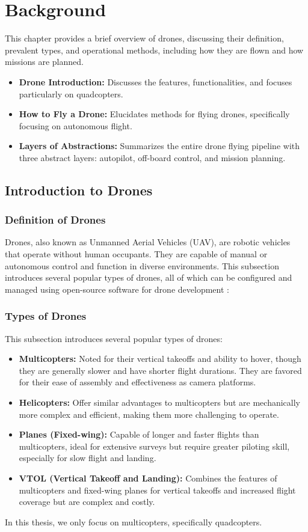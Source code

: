 \chapter{Background}
\label{hello}

This chapter provides a brief overview of drones, discussing their definition, prevalent types, and operational methods, including how they are flown and how missions are planned.

\begin{itemize}
    \item \textbf{Drone Introduction:} Discusses the features, functionalities, and focuses particularly on quadcopters.
    \item \textbf{How to Fly a Drone:} Elucidates methods for flying drones, specifically focusing on autonomous flight.
    \item \textbf{Layers of Abstractions:} Summarizes the entire drone flying pipeline with three abstract layers: autopilot, off-board control, and mission planning.
\end{itemize}

\section{Introduction to Drones}
\subsection{Definition of Drones}
Drones, also known as Unmanned Aerial Vehicles (UAV), are robotic vehicles that operate without human occupants. They are capable of manual or autonomous control and function in diverse environments.
This subsection introduces several popular types of drones, all of which can be configured and managed using open-source software for drone development \cite{px4docs2023} \cite{ardupilot2023}:
\subsection{Types of Drones}
This subsection introduces several popular types of drones:
\begin{itemize}
    \item \textbf{Multicopters:} Noted for their vertical takeoffs and ability to hover, though they are generally slower and have shorter flight durations. They are favored for their ease of assembly and effectiveness as camera platforms.
    \item \textbf{Helicopters:} Offer similar advantages to multicopters but are mechanically more complex and efficient, making them more challenging to operate.
    \item \textbf{Planes (Fixed-wing):} Capable of longer and faster flights than multicopters, ideal for extensive surveys but require greater piloting skill, especially for slow flight and landing.
    \item \textbf{VTOL (Vertical Takeoff and Landing):} Combines the features of multicopters and fixed-wing planes for vertical takeoffs and increased flight coverage but are complex and costly.
\end{itemize}
In this thesis, we only focus on multicopters, specifically quadcopters.

